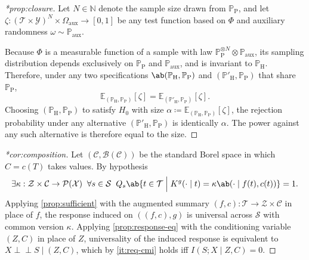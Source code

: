\documentclass[12pt]{article}
\newcommand{\Herwig}{\mathrm{H}}
\newcommand{\Pythia}{\mathrm{P}}
\newcommand{\E}{\mathbb{E}}
\newcommand{\Prb}{\mathbb{P}}
\newcommand{\indep}{\perp\!\!\!\perp}
\newcommand{\Gens}{\mathcal{S}}
\newcommand{\Meas}{\mathcal{P}}
\newcommand{\Borel}{\mathcal{B}}
\newcommand{\1}{\mathbbm{1}}
\renewcommand{\[}{\begin{equation}}
\renewcommand{\]}{\end{equation}}
\begin{document}
\begin{proof}[*prop:closure]
        Let \(N \in \mathbb N\) denote the sample size drawn from \(\Prb_\Pythia\), and let \(\zeta : (\mathcal T \times \mathcal Y)^N \times \Omega_{\mathrm{aux}} \to [0, 1]\) be any test function based on \(\Phi\) and auxiliary randomness \(\omega \sim \Prb_{\mathrm{aux}}\).
        
        Because \(\Phi\) is a measurable function of a sample with law \(\Prb_\Pythia^{\otimes N} \otimes \Prb_{\mathrm{aux}}\), its sampling distribution depends exclusively on \(\Prb_\Pythia\) and \(\Prb_{\mathrm{aux}}\), and is invariant to \(\Prb_\Herwig\).
        Therefore, under any two specifications \(\ab(\Prb_\Herwig,\Prb_\Pythia)\) and \((\Prb'_\Herwig,\Prb_\Pythia)\) that share \(\Prb_\Pythia\),
        \[
            \E_{(\Prb_\Herwig,\Prb_\Pythia)}[\zeta] = \E_{(\Prb'_\Herwig,\Prb_\Pythia)}[\zeta].
        \]
        Choosing \((\Prb_\Herwig, \Prb_\Pythia)\) to satisfy \(H_0\) with size \(\alpha \coloneqq \E_{(\Prb_\Herwig,\Prb_\Pythia)}[\zeta]\), the rejection probability under any alternative \((\Prb'_\Herwig,\Prb_\Pythia)\) is identically \(\alpha\).
        The power against any such alternative is therefore equal to the size.
    \end{proof}

\begin{proof}[*cor:composition]
        Let \((\mathcal C, \Borel(\mathcal C))\) be the standard Borel space in which \(C = c(T)\) takes values. By hypothesis
        \[
            \exists \kappa : \mathcal Z \times \mathcal C \to \Meas(\mathcal X)\;\;\forall s \in \Gens \;\; Q_s \ab\{ t \in \mathcal T \;\Big|\; K^g(\cdot \mid t) = \kappa\ab(\cdot \mid f(t), c(t)) \} = 1.
        \]
        Applying \cref{prop:sufficient} with the augmented summary \((f,c) \colon \mathcal T \to \mathcal Z \times \mathcal C\) in place of \(f\), the response induced on \(((f,c), g)\) is universal across \(\Gens\) with common version \(\kappa\).
        Applying \cref{prop:response-eq} with the conditioning variable \((Z,C)\) in place of \(Z\), universality of the induced response is equivalent to \(X \indep S \mid (Z,C)\), which by \cref{it:req-cmi} holds iff \(I(S; X \mid Z, C) = 0\).
    \end{proof}
\end{document}

